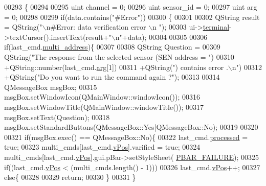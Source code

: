 \begin{DoxyCode}
00293                                                          \{
00294 
00295 uint  channel   = 0;
00296 uint  sensor\_id = 0;
00297 uint  arg       = 0;
00298 
00299     \textcolor{keywordflow}{if}(data.contains(\textcolor{stringliteral}{"#Error"}))
00300     \{
00301 
00302          QString result =  QString(\textcolor{stringliteral}{"\(\backslash\)n#Error: data verification error \(\backslash\)n "});
00303          ui->\hyperlink{a00027_aae71c46ea4546df5994735dee573b2dd}{terminal}->textCursor().insertText(result+\textcolor{stringliteral}{"\(\backslash\)n"}+data);
00304 
00305 
00306              \textcolor{keywordflow}{if}(last\_cmd.\hyperlink{a00001_a8e69b971c61ced27a7567efd2bf0db59}{multi\_address})\{
00307 
00308                  QString Question =
00309                          QString(\textcolor{stringliteral}{"The response from the selected sensor (SEN address = "})
00310                          +QString::number(last\_cmd.\hyperlink{a00001_a56e6c2d7315d0ae60a51e8b140c9cfe4}{arg}[1])
00311                          +QString(\textcolor{stringliteral}{") contains error .\(\backslash\)n"})
00312                          +QString(\textcolor{stringliteral}{"Do you want to run the command again ?"});
00313 
00314                  QMessageBox msgBox;
00315                  msgBox.setWindowIcon(QMainWindow::windowIcon());
00316                  msgBox.setWindowTitle(QMainWindow::windowTitle());
00317                  msgBox.setText(Question);
00318                  msgBox.setStandardButtons(QMessageBox::Yes|QMessageBox::No);
00319 
00320 
00321                  \textcolor{keywordflow}{if}(msgBox.exec() == QMessageBox::No)\{
00322                  last\_cmd.\hyperlink{a00001_a3e88f779da9798a5da7dda227e2ca388}{processed} = \textcolor{keyword}{true};
00323                  multi\_cmds[last\_cmd.\hyperlink{a00001_a2b48b371fd84be2a8ad581b1ad708b88}{vPos}].varified = \textcolor{keyword}{true};
00324                  multi\_cmds[last\_cmd.\hyperlink{a00001_a2b48b371fd84be2a8ad581b1ad708b88}{vPos}].gui.pBar->setStyleSheet(
      \hyperlink{a00034_aa9f43b2774395af6510910f8feed7cb4}{PBAR\_FAILURE});
00325                  \textcolor{keywordflow}{if}((last\_cmd.\hyperlink{a00001_a2b48b371fd84be2a8ad581b1ad708b88}{vPos} < (multi\_cmds.length() - 1)))
00326                      last\_cmd.\hyperlink{a00001_a2b48b371fd84be2a8ad581b1ad708b88}{vPos}++;
00327                  \textcolor{keywordflow}{else}\{
00328 
00329                      \textcolor{keywordflow}{return};
00330                   \}
00331                  \}

\end{DoxyCode}
